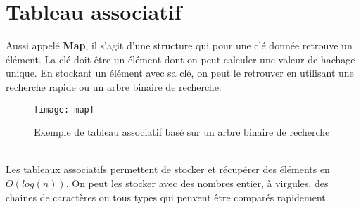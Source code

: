 \documentclass[11pt]{extarticle}
\begin{document}
\section{Tableau associatif}
Aussi appelé \textbf{Map}, il s'agit d'une structure qui pour une clé donnée retrouve un élément. La clé doit être un élément dont on peut calculer une valeur de hachage unique. En stockant un élément avec sa clé, on peut le retrouver en utilisant une recherche rapide ou un arbre binaire de recherche.
\begin{figure}[h]
\begin{center}
\texttt{[image: map]}
\caption{Exemple de tableau associatif basé sur un arbre binaire de recherche}
\end{center}
\end{figure}\\
Les tableaux associatifs permettent de stocker et récupérer des éléments en $O(log(n))$. On peut les stocker avec des nombres entier, à virgules, des chaines de caractères ou tous types qui peuvent être comparés rapidement.
\end{document}

